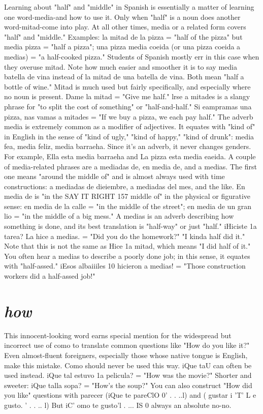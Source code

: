 {{{{%
Learning about "half" and "middle" in Spanish is essentially a
matter of learning one word-media-and how to use it. Only when
"half" is a noun does another word-mitad-come into play. At all
other times, media or a related form covers "half" and "middle." Examples: la mitad de la pizza = "half of the pizza" but media pizza =
"half a pizza"; una pizza media coeida (or una pizza coeida a medias)
= "a half-cooked pizza."
Students of Spanish mostly err in this case when they overuse
mitad. Note how much easier and smoother it is to say media batella
de vina instead of la mitad de una batella de vina. Both mean "half a
bottle of wine." Mitad is much used but fairly specifically, and especially where no noun is present. Dame la mitad = "Give me half."
lrse a mitades is a slangy phrase for "to split the cost of something" or
"half-and-half." Si eampramas una pizza, nas vamas a mitades = "If
we buy a pizza, we each pay half."
The adverb media is extremely common as a modifier of adjectives. It equates with "kind of" in English in the sense of "kind of
ugly," "kind of happy," "kind of drunk": media fea, media feliz, media
barraeha. Since it's an adverb, it never changes genders. For example,
Ella esta media barraeha and La pizza esta media eaeida.
A couple of media-related phrases are a mediadas de, en media de, and a medias. The first one means "around the middle of"
and is almost always used with time constructions: a mediadas de dieiembre, a mediadas del mes, and the like. En media de is "in the
SAY IT RIGHT 157
middle of" in the physical or figurative sense: en media de la calle
= "in the middle of the street"; en media de un gran lio = "in the
middle of a big mess." A medias is an adverb describing how something is done, and its best translation is "half-way" or just "half." iHiciste 1a tarea? La hice a medias. = "Did you do the homework?" "I
kinda half did it." Note that this is not the same as Hice 1a mitad,
which means "I did half of it." You often hear a medias to describe a
poorly done job; in this sense, it equates with "half-assed." iEsos albaiiiles 10 hicieron a medias! = "Those construction workers did a
half-assed job!"

\section{\emph{how}}

This innocent-looking word earns special mention for the
widespread but incorrect use of como to translate common questions
like "How do you like it?" Even almost-fluent foreigners, especially
those whose native tongue is English, make this mistake. Como
should never be used this way. iQue taU can often be used instead.
iQue tal estuvo 1a pelicula? = "How was the movie?" Shorter and
sweeter: iQue talla sopa? = "How's the soup?" You can also construct "How did you like" questions with parecer (iQue te pareClO 0' . . ..l) and ( gustar i 'T' L e gusto. ' . . .. l) But iC' omo te gusto'l . ... IS 0
always an absolute no-no.

}}}}
